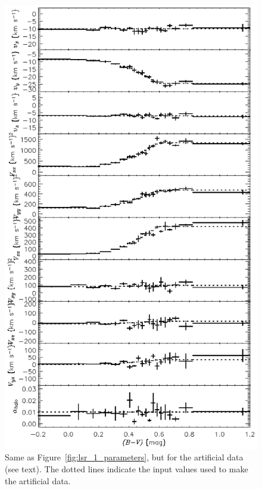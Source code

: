 \documentclass[12pt,preprint]{aastex}
\begin{document}
\clearpage
\begin{figure}
\includegraphics{lsr_1fake_parameters.ps}
\caption{Same as Figure~\ref{fig:lsr_1_parameters}, but for the
artificial data (see text).  The dotted lines indicate the input
values used to make the artificial
data.\label{fig:lsr_1fake_parameters}}
\end{figure}
\end{document}
